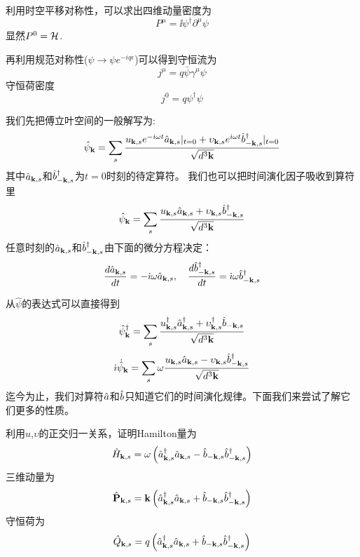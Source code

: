 \documentclass[CJK]{beamer}
\begin{document}
\begin{frame}
\bch
利用时空平移对称性，可以求出四维动量密度为
$$P^\mu = \ii\psi^\dagger \partial^\mu \psi$$
显然$P^0 = {\mathcal{H}}$.

再利用规范对称性($\psi \rightarrow \psi e^{-iq\epsilon}$)可以得到守恒流为
$$j^\mu = q \bar\psi \gamma^\mu \psi$$
守恒荷密度
$$j^0 =  q\psi^\dagger\psi$$
\ech
\end{frame}


\begin{frame}
\bch
我们先把傅立叶空间的一般解写为:
$$\hat\psi_{{\mathbf{k}}} = \sum_{s}\frac{u_{{\mathbf{k}},s}e^{-{\dot{\imath}} \omega t} {\hat{a}}_{{\mathbf{k}},s}|_{t=0} + \upsilon_{{\mathbf{k}},s}e^{{\dot{\imath}} \omega t} {\hat{b}^\dagger}_{-{\mathbf{k}},s}|_{t=0}}{\sqrt{d^3{\mathbf{k}}}}$$
其中${\hat{a}}_{{\mathbf{k}},s}$和${\hat{b}^\dagger}_{-{\mathbf{k}},s}$为$t=0$时刻的待定算符。
我们也可以把时间演化因子吸收到算符里
$$\hat\psi_{{\mathbf{k}}} = \sum_{s}\frac{u_{{\mathbf{k}},s} {\hat{a}}_{{\mathbf{k}},s} + \upsilon_{{\mathbf{k}},s} {\hat{b}^\dagger}_{-{\mathbf{k}},s}}{\sqrt{d^3{\mathbf{k}}}}$$
任意时刻的${\hat{a}}_{{\mathbf{k}},s}$和${\hat{b}^\dagger}_{-{\mathbf{k}},s}$由下面的微分方程决定：
$$\frac{d{\hat{a}}_{{\mathbf{k}},s}}{dt} = - {\dot{\imath}}\omega {\hat{a}}_{{\mathbf{k}},s},\ \ \ \frac{d{\hat{b}^\dagger}_{-{\mathbf{k}},s}}{dt} = {\dot{\imath}}\omega {\hat{b}^\dagger}_{-{\mathbf{k}},s}$$
\ech
\end{frame}

\begin{frame}
\bch
从$\hat\psi$的表达式可以直接得到
$$\hat\psi^\dagger_{{\mathbf{k}}} = \sum_s \frac{u^\dagger_{{\mathbf{k}},s} {\hat{a}^\dagger}_{{\mathbf{k}},s} + \upsilon^\dagger_{{\mathbf{k}},s} {\hat{b}}_{-{\mathbf{k}},s}}{\sqrt{d^3{\mathbf{k}}}}$$
$${\dot{\imath}} \dot{\hat\psi}_{{\mathbf{k}}} = \sum_s \omega  \frac{u_{{\mathbf{k}},s}{\hat{a}}_{{\mathbf{k}},s} - \upsilon_{{\mathbf{k}},s}{\hat{b}^\dagger}_{-{\mathbf{k}},s}}{\sqrt{d^3{\mathbf{k}}}} $$
迄今为止，我们对算符${\hat{a}}$和${\hat{b}}$只知道它们的时间演化规律。下面我们来尝试了解它们更多的性质。
\ech
\end{frame}

\begin{frame}
\bch
利用$u$,$\upsilon$的正交归一关系，证明Hamilton量为
$$\hat{H}_{{\mathbf{k}},s} =  \omega\left({\hat{a}^\dagger}_{{\mathbf{k}},s}{\hat{a}}_{{\mathbf{k}},s} - {\hat{b}}_{-{\mathbf{k}},s}{\hat{b}^\dagger}_{-{\mathbf{k}},s} \right)$$
三维动量为
$$\hat{\mathbf{P}}_{{\mathbf{k}},s} =  {\mathbf{k}}\left({\hat{a}^\dagger}_{{\mathbf{k}},s}{\hat{a}}_{{\mathbf{k}},s} + {\hat{b}}_{-{\mathbf{k}},s}{\hat{b}^\dagger}_{-{\mathbf{k}},s} \right)$$
守恒荷为
$$\hat{Q}_{{\mathbf{k}},s} =  q\left({\hat{a}^\dagger}_{{\mathbf{k}},s}{\hat{a}}_{{\mathbf{k}},s} + {\hat{b}}_{-{\mathbf{k}},s}{\hat{b}^\dagger}_{-{\mathbf{k}},s} \right)$$
\ech
\end{frame}
\end{document}

